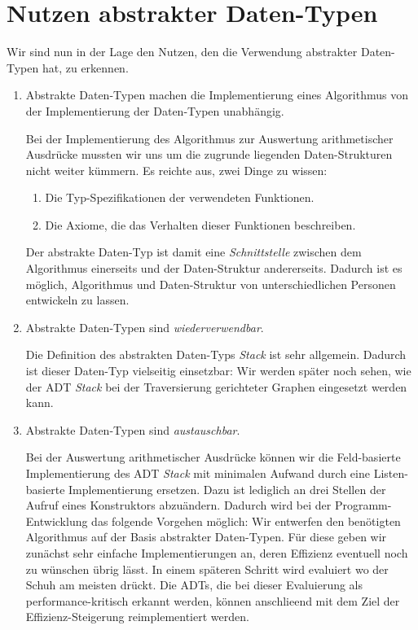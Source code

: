 \section{Nutzen abstrakter Daten-Typen}
Wir sind nun in der Lage den Nutzen, den die Verwendung abstrakter Daten-Typen hat, zu
erkennen. 
\begin{enumerate}
\item Abstrakte Daten-Typen machen die Implementierung eines Algorithmus von der
      Implementierung der Daten-Typen unabh\"angig.

      Bei der Implementierung des Algorithmus zur Auswertung arithmetischer Ausdr\"ucke
      mussten wir uns um die zugrunde liegenden Daten-Strukturen nicht weiter k\"ummern. 
      Es reichte aus, zwei Dinge zu wissen: 
      \begin{enumerate}
      \item Die Typ-Spezifikationen der verwendeten Funktionen.
      \item Die Axiome, die das Verhalten dieser Funktionen beschreiben.
      \end{enumerate}
      Der abstrakte Daten-Typ ist damit eine \emph{Schnittstelle} zwischen dem Algorithmus
      einerseits und der Daten-Struktur andererseits.  Dadurch ist es m\"oglich, Algorithmus
      und Daten-Struktur von unterschiedlichen Personen entwickeln zu lassen.
\item Abstrakte Daten-Typen sind \emph{wiederverwendbar}.

      Die Definition des abstrakten Daten-Typs \emph{Stack} ist sehr allgemein. Dadurch
      ist dieser Daten-Typ vielseitig einsetzbar:  Wir werden sp\"ater noch sehen, wie der
      ADT \emph{Stack} bei der Traversierung gerichteter Graphen eingesetzt werden kann.
\item Abstrakte Daten-Typen sind \emph{austauschbar}.

      Bei der Auswertung arithmetischer Ausdr\"ucke k\"onnen wir die
      Feld-basierte Implementierung des ADT \emph{Stack} mit minimalen Aufwand durch 
      eine Listen-basierte Implementierung ersetzen.  Dazu ist lediglich an drei Stellen
      der Aufruf eines Konstruktors abzu\"andern.
      Dadurch wird bei der
      Programm-Entwicklung das folgende Vorgehen m\"oglich: Wir entwerfen den ben\"otigten
      Algorithmus auf der Basis abstrakter Daten-Typen.  F\"ur diese geben wir zun\"achst sehr
      einfache Implementierungen an, deren Effizienz eventuell noch zu w\"unschen \"ubrig
      l\"asst.  In einem sp\"ateren Schritt wird evaluiert wo der Schuh am meisten dr\"uckt.
      Die ADTs, die bei dieser Evaluierung als performance-kritisch erkannt werden, k\"onnen
      anschlie\3end mit dem Ziel der Effizienz-Steigerung reimplementiert werden.
\end{enumerate}
\pagebreak

